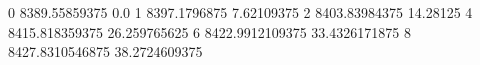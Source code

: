 0 8389.55859375 0.0
1 8397.1796875 7.62109375
2 8403.83984375 14.28125
4 8415.818359375 26.259765625
6 8422.9912109375 33.4326171875
8 8427.8310546875 38.2724609375

